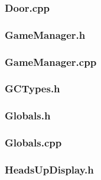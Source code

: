 \documentclass{article}
\begin{document}
\subsubsection{Door.cpp}
	
 				
\subsubsection{GameManager.h}
	

\subsubsection{GameManager.cpp}
	
	 				
\subsubsection{GCTypes.h}
	
	 				
\subsubsection{Globals.h}
	 
	 				
\subsubsection{Globals.cpp}
	 
	 				
	 				
\subsubsection{HeadsUpDisplay.h}
	 
	 				
\end{document}
